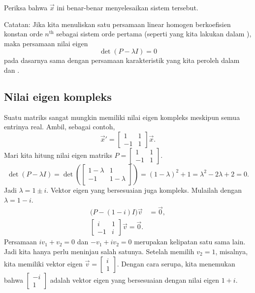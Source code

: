 \begin{exercise}
Periksa bahwa $\vec{x}$ ini benar-benar menyelesaikan sistem tersebut.
\end{exercise}

Catatan: Jika kita menuliskan satu persamaan linear homogen berkoefisien konstan
orde $n^{\text{th}}$
sebagai sistem orde pertama (seperti yang kita lakukan dalam ),
maka persamaan nilai eigen
\begin{equation*}
\det(P - \lambda I) = 0
\end{equation*}
pada dasarnya sama dengan persamaan karakteristik yang kita peroleh dalam
 dan .

\subsection{Nilai eigen kompleks}

Suatu matriks sangat mungkin memiliki nilai eigen kompleks meskipun semua entrinya
real.  Ambil, sebagai contoh,
\begin{equation*}
{\vec{x}}' =
\begin{bmatrix}
1 & 1 \\
-1 & 1
\end{bmatrix}
\vec{x} .
\end{equation*}
Mari kita hitung nilai eigen
matriks $P = \left[ \begin{smallmatrix} 1 & 1 \\ -1 & 1 \end{smallmatrix}
\right]$.
\begin{equation*}
\det(P - \lambda I) =
\det\left(
\begin{bmatrix}
1-\lambda & 1 \\
-1 & 1-\lambda
\end{bmatrix}
\right)
= {(1-\lambda)}^2 + 1
= \lambda^2 - 2 \lambda + 2 = 0 .
\end{equation*}
Jadi $\lambda = 1 \pm i$.
Vektor eigen yang bersesuaian juga kompleks.
Mulailah dengan $\lambda = 1-i$.
\begin{align*}
\bigl(P-(1-i) I\bigr) \vec{v} & = \vec{0} , \\
\begin{bmatrix}
i & 1 \\
-1 & i
\end{bmatrix}
\vec{v} = \vec{0}.
\end{align*}
Persamaan $i v_1 + v_2 = 0$ dan $-v_1 + iv_2 = 0$
merupakan kelipatan satu sama lain.  Jadi kita hanya perlu meninjau salah satunya.
Setelah memilih $v_2 = 1$, misalnya, kita memiliki
vektor eigen
$\vec{v} = \left[ \begin{smallmatrix} i \\ 1 \end{smallmatrix} \right]$.
Dengan cara serupa, kita menemukan bahwa
$\left[ \begin{smallmatrix} -i \\ 1 \end{smallmatrix} \right]$
adalah vektor eigen yang bersesuaian dengan nilai eigen $1+i$.

